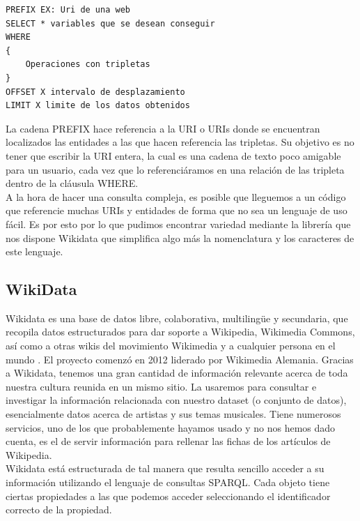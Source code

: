 \begin{lstlisting}[language=SPARQL]
PREFIX EX: Uri de una web
SELECT * variables que se desean conseguir
WHERE
{
	Operaciones con tripletas
}
OFFSET X intervalo de desplazamiento
LIMIT X limite de los datos obtenidos
\end{lstlisting}
\bigskip

La cadena PREFIX hace referencia a la URI o URIs donde se encuentran localizados las entidades a las que hacen referencia las tripletas. Su objetivo es no tener que escribir la URI entera, la cual es una cadena de texto poco amigable para un usuario, cada vez que lo referenciáramos en una relación de las tripleta dentro de la cláusula WHERE.\\

A la hora de hacer una consulta compleja, es posible que lleguemos a un código que referencie muchas URIs y entidades de forma que no sea un lenguaje de uso fácil. Es por esto por lo que pudimos encontrar variedad mediante la librería que nos dispone Wikidata que simplifica algo más la nomenclatura y los caracteres de este lenguaje.\\

\subsection{WikiData}

Wikidata es una base de datos libre, colaborativa, multilingüe y secundaria, que recopila datos estructurados para dar soporte a Wikipedia, Wikimedia Commons, así como a otras wikis del movimiento Wikimedia y a cualquier persona en el mundo \cite{wikidataIntro}. El proyecto comenzó en 2012 liderado por Wikimedia Alemania. Gracias a Wikidata, tenemos una gran cantidad de información relevante acerca de toda nuestra cultura reunida en un mismo sitio. La usaremos para consultar e investigar la información relacionada con nuestro dataset (o conjunto de datos), esencialmente datos acerca de artistas y sus temas musicales. Tiene numerosos servicios, uno de los que probablemente hayamos usado y no nos hemos dado cuenta, es el de servir información para rellenar las fichas de los artículos de Wikipedia.\\

Wikidata está estructurada de tal manera que resulta sencillo acceder a su información utilizando el lenguaje de consultas SPARQL. Cada objeto tiene ciertas propiedades a las que podemos acceder seleccionando el identificador correcto de la propiedad.\\

